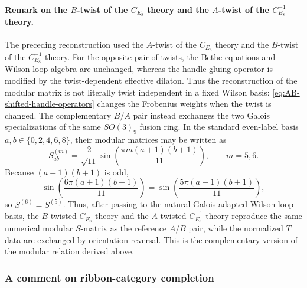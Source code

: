 \documentclass[11pt,a4paper]{article}
\numberwithin{equation}{section}
\begin{document}
\paragraph{Remark on the $B$-twist of the $C_{E_8}$ theory and the $A$-twist of the $C_{E_8}^{-1}$ theory.}
The preceding reconstruction used the $A$-twist of the $C_{E_8}$ theory and the $B$-twist of the $C_{E_8}^{-1}$ theory.  For the opposite pair of twists, the Bethe equations and Wilson loop algebra are unchanged, whereas the handle-gluing operator is modified by the twist-dependent effective dilaton.  Thus the reconstruction of the modular matrix is not literally twist independent in a fixed Wilson basis: \eqref{eq:AB-shifted-handle-operators} changes the Frobenius weights when the twist is changed.  The complementary $B/A$ pair instead exchanges the two Galois specializations of the same $SO(3)_9$ fusion ring.  In the standard even-label basis $a,b\in\{0,2,4,6,8\}$, their modular matrices may be written as
\begin{equation}
  S^{(m)}_{ab}
  =\frac{2}{\sqrt{11}}
  \sin\!\left(\frac{\pi m(a+1)(b+1)}{11}\right),
  \qquad m=5,6.
  \label{eq:SO39-S-Galois-pair}
\end{equation}
Because $(a+1)(b+1)$ is odd,
\begin{equation}
  \sin\!\left(\frac{6\pi(a+1)(b+1)}{11}\right)
  =
  \sin\!\left(\frac{5\pi(a+1)(b+1)}{11}\right),
  \label{eq:SO39-S-Galois-5-6-equality}
\end{equation}
so $S^{(6)}=S^{(5)}$.  Thus, after passing to the natural Galois-adapted Wilson loop basis, the $B$-twisted $C_{E_8}$ theory and the $A$-twisted $C_{E_8}^{-1}$ theory reproduce the same numerical modular $S$-matrix as the reference $A/B$ pair, while the normalized $T$ data are exchanged by orientation reversal.  This is the complementary version of the modular relation derived above.

\subsubsection{A comment on ribbon-category completion}
\label{subsec:full-ribbon-TQFT-completion}
\end{document}
